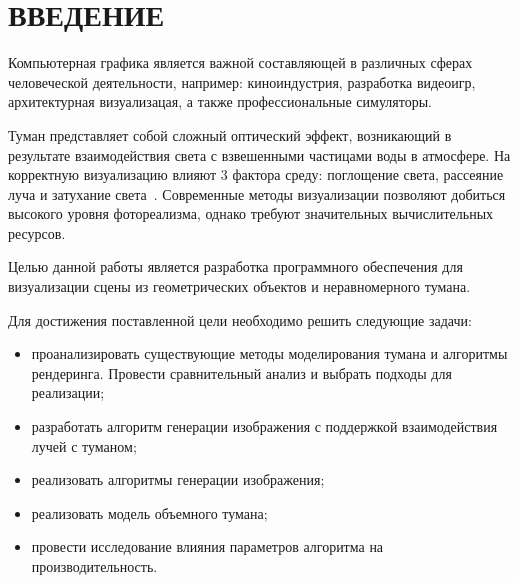 \section*{ВВЕДЕНИЕ}

Компьютерная графика является важной составляющей в различных сферах человеческой деятельности, например: киноиндустрия,
разработка видеоигр, архитектурная визуализацая, а также профессиональные симуляторы.

Туман представляет собой сложный оптический эффект, возникающий в результате взаимодействия света с взвешенными частицами воды в атмосфере.
На корректную визуализацию влияют 3 фактора среду: поглощение света, рассеяние луча и затухание света~\cite{fog-effects}. 
Современные методы визуализации
позволяют добиться высокого уровня фотореализма, однако требуют значительных вычислительных ресурсов.

Целью данной работы является разработка программного обеспечения для визуализации сцены из геометрических объектов и неравномерного тумана.

Для достижения поставленной цели необходимо решить следующие задачи:
\begin{itemize}
    \item проанализировать существующие методы моделирования тумана и алгоритмы рендеринга. Провести сравнительный анализ и выбрать подходы для реализации;
    \item разработать алгоритм генерации изображения с поддержкой взаимодействия лучей с туманом;
    \item реализовать алгоритмы генерации изображения;
    \item реализовать модель объемного тумана;
    \item провести исследование влияния параметров алгоритма на производительность.
\end{itemize}

\clearpage
